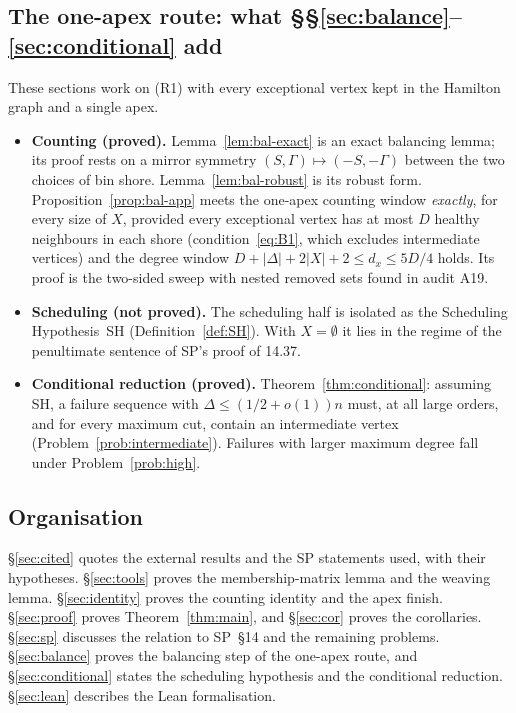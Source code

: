 \documentclass[11pt]{article}
\theoremstyle{definition}
\begin{document}
\subsection{The one-apex route: what \S\S\ref{sec:balance}--\ref{sec:conditional} add}
These sections work on (R1) with every exceptional vertex kept in the Hamilton graph and a single apex.
\begin{itemize}[nosep]
\item \textbf{Counting (proved).} Lemma~\ref{lem:bal-exact} is an exact balancing lemma; its proof rests on a mirror symmetry $(S,\Gamma)\mapsto(-S,-\Gamma)$ between the two choices of bin shore. Lemma~\ref{lem:bal-robust} is its robust form. Proposition~\ref{prop:bal-app} meets the one-apex counting window \emph{exactly}, for every size of $X$, provided every exceptional vertex has at most $D$ healthy neighbours in each shore (condition~\eqref{eq:B1}, which excludes intermediate vertices) and the degree window $D+|\Delta|+2|X|+2\le d_x\le5D/4$ holds. Its proof is the two-sided sweep with nested removed sets found in audit A19.
\item \textbf{Scheduling (not proved).} The scheduling half is isolated as the Scheduling Hypothesis~SH (Definition~\ref{def:SH}). With $X=\emptyset$ it lies in the regime of the penultimate sentence of SP's proof of 14.37.
\item \textbf{Conditional reduction (proved).} Theorem~\ref{thm:conditional}: assuming SH, a failure sequence with $\Delta\le(1/2+o(1))n$ must, at all large orders, and for every maximum cut, contain an intermediate vertex (Problem~\ref{prob:intermediate}). Failures with larger maximum degree fall under Problem~\ref{prob:high}.
\end{itemize}

\subsection{Organisation}
\S\ref{sec:cited} quotes the external results and the SP statements used, with their hypotheses. \S\ref{sec:tools} proves the membership-matrix lemma and the weaving lemma. \S\ref{sec:identity} proves the counting identity and the apex finish. \S\ref{sec:proof} proves Theorem~\ref{thm:main}, and \S\ref{sec:cor} proves the corollaries. \S\ref{sec:sp} discusses the relation to SP~\S14 and the remaining problems. \S\ref{sec:balance} proves the balancing step of the one-apex route, and \S\ref{sec:conditional} states the scheduling hypothesis and the conditional reduction. \S\ref{sec:lean} describes the Lean formalisation.
\end{document}
